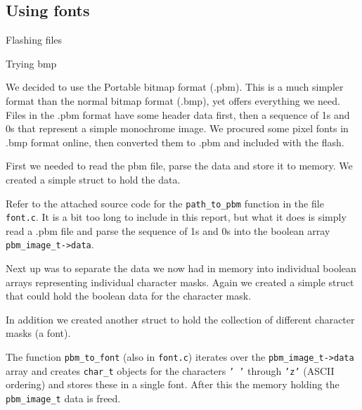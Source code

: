 \subsection{Using fonts}

Flashing files

Trying bmp

We decided to use the Portable bitmap format (.pbm).
This is a much simpler format than the normal bitmap format (.bmp),
yet offers everything we need.
Files in the .pbm format have some header data first, then a sequence of 1s and 0s that represent a simple monochrome image.
We procured some pixel fonts in .bmp format online, then converted them to .pbm and included with the flash.

First we needed to read the pbm file, parse the data and store it to memory.
We created a simple struct to hold the data.



Refer to the attached source code for the \texttt{path\_to\_pbm} function in the file \texttt{font.c}.
It is a bit too long to include in this report, but what it does is simply read a .pbm file and parse the sequence of 1s and 0s into the boolean array \texttt{pbm\_image\_t->data}.

Next up was to separate the data we now had in memory into individual boolean arrays representing individual character masks.
Again we created a simple struct that could hold the boolean data for the character mask.



In addition we created another struct to hold the collection of different character masks (a font).



The function \texttt{pbm\_to\_font} (also in \texttt{font.c}) iterates over the \texttt{pbm\_image\_t->data} array and creates \texttt{char\_t} objects for the characters \texttt{' '} through \texttt{'z'} (ASCII ordering) and stores these in a single font.
After this the memory holding the \texttt{pbm\_image\_t} data is freed.

